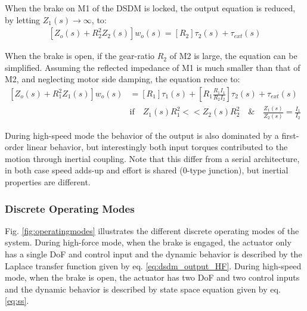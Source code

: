 When the brake on M1 of the DSDM is locked, the output equation is reduced, by letting $Z_1(s) \rightarrow \infty$, to:
\begin{align}
\left[
 Z_o(s)  + R_2^2 Z_2(s)
\right] w_o(s) = 
\left[
R_2
\right] \tau_2(s)  + 
\tau_{ext}(s)
\label{eq:dsdm_output_HF}
\end{align}

When the brake is open, if the gear-ratio $R_2$ of M2 is large, the equation can be simplified. 
%
%
Assuming the reflected impedance of M1 is much smaller than that of M2, and neglecting motor side damping, the equation reduce to:
\begin{align}
\left[
Z_o(s)  + R_1^2 Z_1(s)
\right] w_o(s) &= 
\left[
R_1
\right] \tau_1(s)  + 
\left[
R_1 \frac{R_1 I_1}{R_2 I_2}
\right] \tau_2(s)  + 
\tau_{ext}(s) \\
&\text{if} \quad Z_1(s) R_1^2 << Z_2(s) R_2^2 
\quad \& \quad \frac{Z_1(s)}{Z_2(s)} = \frac{I_1}{I_2}
\label{eq:dsdm_output_HF}
\end{align}

During high-speed mode the behavior of the output is also dominated by a first-order linear behavior, but interestingly both input torques contributed to the motion through inertial coupling. Note that this differ from a serial architecture, in both case speed adds-up and effort is shared (0-type junction), but inertial properties are different.


\subsubsection{Discrete Operating Modes}

Fig. \ref{fig:operatingmodes} illustrates the different discrete operating modes of the system. During high-force mode, when the brake is engaged, the actuator only has a single DoF and control input and the dynamic behavior is described by the Laplace transfer function given by eq. \eqref{eq:dsdm_output_HF}. During high-speed mode, when the brake is open, the actuator has two DoF and two control inputs and the dynamic behavior is described by state space equation given by eq. \eqref{eq:ss}.

